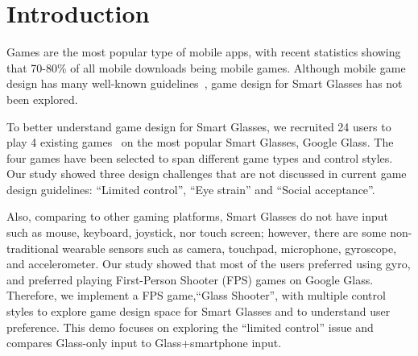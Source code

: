 \documentclass{sigchi}
\begin{document}



\section{Introduction}
Games are the most popular type of mobile apps, with recent statistics showing that 70-80\% of all mobile downloads being mobile games\cite{statistics,infographic}. Although mobile game design has many well-known guidelines~\cite{videogame,mobilegame,bodygame,gameflow,argame,wearable}, game design for Smart Glasses has not been explored.%

To better understand game design for Smart Glasses, we recruited 24 users to play 4 existing games~\cite{minigame} on the most popular Smart Glasses, Google Glass. The four games have been selected to span different game types and control styles. Our study showed three design challenges that are not discussed in current game design guidelines: ``Limited control'', ``Eye strain'' and ``Social acceptance''. 

Also, comparing to other gaming platforms, Smart Glasses do not have input such as mouse, keyboard, joystick, nor touch screen; however, there are some non-traditional wearable sensors such as camera, touchpad, microphone, gyroscope, and accelerometer. Our study showed that most of the users preferred using gyro, and preferred playing First-Person Shooter (FPS) games on Google Glass. Therefore, we implement a FPS game,``Glass Shooter'', with multiple control styles to explore game design space for Smart Glasses and to understand user preference.
This demo focuses on exploring the ``limited control'' issue and compares Glass-only input to Glass+smartphone input. 

\end{document}

